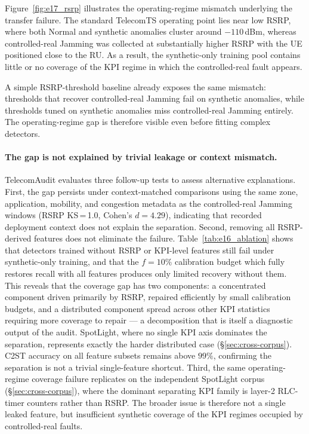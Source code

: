 \documentclass[sigconf,review]{acmart}
\begin{document}
Figure~\ref{fig:e17_rsrp} illustrates the operating-regime mismatch underlying the transfer failure. The standard TelecomTS operating point lies near low RSRP, where both Normal and synthetic anomalies cluster around $-110$\,dBm, whereas controlled-real Jamming was collected at substantially higher RSRP with the UE positioned close to the RU. As a result, the synthetic-only training pool contains little or no coverage of the KPI regime in which the controlled-real fault appears.

A simple RSRP-threshold baseline already exposes the same mismatch: thresholds that recover controlled-real Jamming fail on synthetic anomalies, while thresholds tuned on synthetic anomalies miss controlled-real Jamming entirely. The operating-regime gap is therefore visible even before fitting complex detectors.

\paragraph{The gap is not explained by trivial leakage or context mismatch.}
TelecomAudit evaluates three follow-up tests to assess 
alternative explanations. First, the gap persists under context-matched 
comparisons using the same zone, application, mobility, and congestion 
metadata as the controlled-real Jamming windows (RSRP KS\,=\,1.0, 
Cohen's $d=4.29$), indicating that recorded deployment context does not 
explain the separation. Second, removing all RSRP-derived features does 
not eliminate the failure. Table~\ref{tab:e16_ablation} shows that 
detectors trained without RSRP or KPI-level features still fail under 
synthetic-only training, and that the $f=10\%$ calibration budget which 
fully restores recall with all features produces only limited recovery 
without them. This reveals that the coverage gap has two components: a 
concentrated component driven primarily by RSRP, repaired efficiently by 
small calibration budgets, and a distributed component spread across 
other KPI statistics requiring more coverage to repair — a decomposition 
that is itself a diagnostic output of the audit. SpotLight, where no 
single KPI axis dominates the separation, represents exactly the harder 
distributed case (\S\ref{sec:cross-corpus}). C2ST accuracy on all 
feature subsets remains above $99\%$, confirming the separation is not 
a trivial single-feature shortcut. Third, the same operating-regime 
coverage failure replicates on the independent SpotLight corpus 
(\S\ref{sec:cross-corpus}), where the dominant separating KPI family 
is layer-2 RLC-timer counters rather than RSRP. The broader issue is 
therefore not a single leaked feature, but insufficient synthetic 
coverage of the KPI regimes occupied by controlled-real faults.
\end{document}
